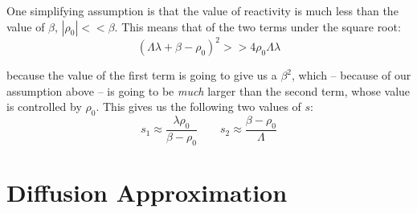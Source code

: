 \documentclass[letter]{article}
\begin{document}
One simplifying assumption is that the value of reactivity is much less than the
value of $\beta$, $|\rho_0| << \beta$. This means that of the two
terms under the square root:
\begin{equation*}
  (\Lambda\lambda+\beta-\rho_0)^2 >> 4\rho_0\Lambda\lambda
\end{equation*}

because the value of the first term is going to give us a $\beta^2$,
which -- because of our assumption above -- is going to be
\textit{much} larger than the second term, whose value is controlled
by $\rho_0$. This gives us the following two values of $s$:
\begin{equation*}
    s_1 \approx \frac{\lambda\rho_0}{\beta-\rho_0} \quad\quad
    s_2 \approx \frac{\beta-\rho_0}{\Lambda}
\end{equation*}


\section{Diffusion Approximation}



\end{document}
